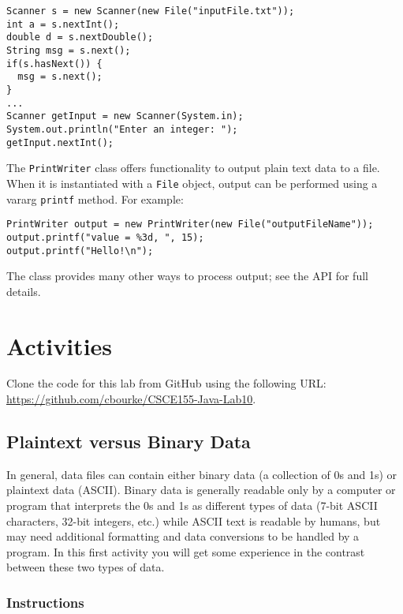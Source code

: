 \documentclass[12pt]{scrartcl}
\begin{document}
\begin{verbatim}
Scanner s = new Scanner(new File("inputFile.txt"));
int a = s.nextInt();
double d = s.nextDouble();
String msg = s.next();
if(s.hasNext()) {
  msg = s.next();
}
...
Scanner getInput = new Scanner(System.in);
System.out.println("Enter an integer: ");
getInput.nextInt();
\end{verbatim}

The \texttt{PrintWriter} class offers functionality to output plain 
text data to a file.  When it is instantiated with a \texttt{File} object, 
output can be performed using a vararg \texttt{printf} method.  
For example:

\begin{verbatim}
PrintWriter output = new PrintWriter(new File("outputFileName"));
output.printf("value = %3d, ", 15);
output.printf("Hello!\n");
\end{verbatim}

The class provides many other ways to process output; see the 
API for full details. 

\section{Activities}

Clone the code for this lab from GitHub using the following URL: 
\url{https://github.com/cbourke/CSCE155-Java-Lab10}.

\subsection{Plaintext versus Binary Data}

In general, data files can contain either binary data (a collection of 0s and 1s) 
or plaintext data (ASCII).  Binary data is generally readable only by a computer 
or program that interprets the 0s and 1s as different types of data (7-bit ASCII 
characters, 32-bit integers, etc.) while ASCII text is readable by humans, but 
may need additional formatting and data conversions to be handled by a 
program.  In this first activity you will get some experience in the contrast 
between these two types of data.

\subsubsection*{Instructions}
\end{document}
